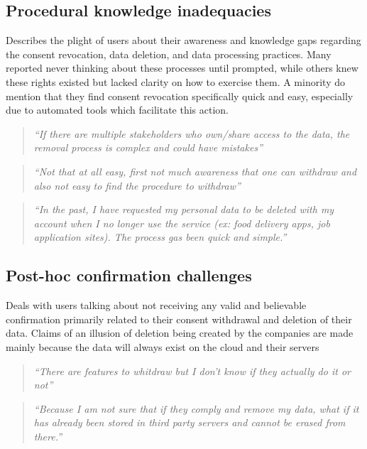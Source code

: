 \subsection{Procedural knowledge inadequacies} \label{T2.2:Not transparent process}
Describes the plight of users about their awareness and knowledge gaps regarding the consent revocation, data deletion, and data processing practices. Many reported never thinking about these processes until prompted, while others knew these rights existed but lacked clarity on how to exercise them. A minority do mention that they find consent revocation specifically quick and easy, especially due to automated tools which facilitate this action.
        \begin{quote}
            \textit{``If there are multiple stakeholders who own/share access to the data, the removal process is complex and could have mistakes''}
        \end{quote}
        \begin{quote}
            \textit{``Not that at all easy, first not much awareness that one can withdraw and also not easy to find the procedure to withdraw''}
        \end{quote}
        \begin{quote}
            \textit{``In the past, I have requested my personal data to be deleted with my account when I no longer use the service (ex: food delivery apps, job application sites). The process gas been quick and simple.''}
        \end{quote}
        
\subsection{Post-hoc confirmation challenges} \label{T2.3:Noconfirmation}
Deals with users talking about not receiving any valid and believable confirmation primarily related to their consent withdrawal and deletion of their data. Claims of an illusion of deletion being created by the companies are made mainly because the data will always exist on the cloud and their servers
        \begin{quote}
            \textit{``There are features to whitdraw but I don’t know if they actually do it or not''}
        \end{quote}
        \begin{quote}    
            \textit{``Because I am not sure that if they comply and remove my data, what if it has already been stored in third party servers and cannot be erased from there.''}
        \end{quote}
        
